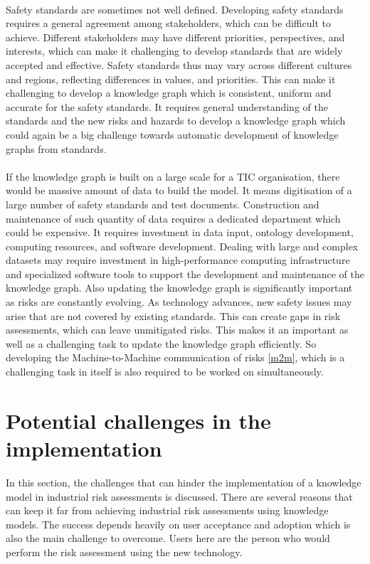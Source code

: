 \paragraph{} Safety standards are sometimes not well defined. Developing safety standards requires a general agreement among stakeholders, which can be difficult to achieve. Different stakeholders may have different priorities, perspectives, and interests, which can make it challenging to develop standards that are widely accepted and effective. Safety standards thus may vary across different cultures and regions, reflecting differences in values, and priorities. This can make it challenging to develop a knowledge graph which is consistent, uniform and accurate for the safety standards. It requires general understanding of the standards and the new risks and hazards to develop a knowledge graph which could again be a big challenge towards automatic development of knowledge graphs from standards.

\paragraph{} If the knowledge graph is built on a large scale for a TIC organisation, there would be massive amount of data to build the model. It means digitisation of a large number of safety standards and test documents. Construction and maintenance of such quantity of data requires a dedicated department which could be expensive. It requires investment in data input, ontology development, computing resources, and software development. Dealing with large and complex datasets may require investment in high-performance computing infrastructure and specialized software tools to support the development and maintenance of the knowledge graph. Also updating the knowledge graph is significantly important as risks are constantly evolving. As technology advances, new safety issues may arise that are not covered by existing standards. This can create gaps in risk assessments, which can leave unmitigated risks. This makes it an important as well as a challenging task to update the knowledge graph efficiently. So developing the Machine-to-Machine communication of risks \ref{m2m}, which is a challenging task in itself is also required to be worked on simultaneously.

\section{Potential challenges in the implementation}
In this section, the challenges that can hinder the implementation of a knowledge model in industrial risk assessments is discussed. There are several reasons that can keep it far from achieving industrial risk assessments using knowledge models. The success depends heavily on user acceptance and adoption which is also the main challenge to overcome. Users here are the person who would perform the risk assessment using the new technology.

